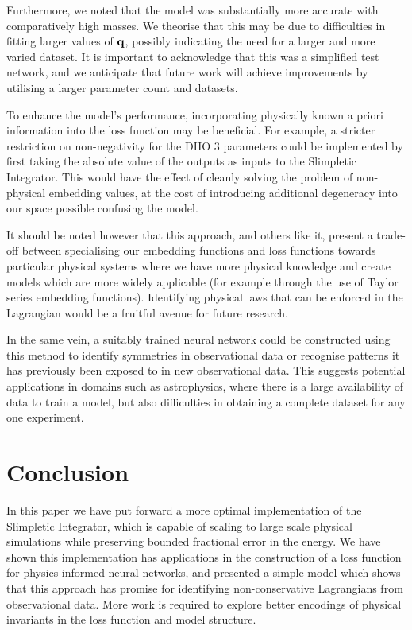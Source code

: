 Furthermore, we noted that the model was substantially more accurate with comparatively high masses. We theorise that this may be due to difficulties in fitting larger values of $\vb{q}$, possibly indicating the need for a larger and more varied dataset. It is important to acknowledge that this was a simplified test network, and we anticipate that future work will achieve improvements by utilising a larger parameter count and datasets.

To enhance the model's performance, incorporating physically known a priori information into the loss function may be beneficial. For example, a stricter restriction on non-negativity for the DHO 3 parameters could be implemented by first taking the absolute value of the outputs as inputs to the Slimpletic Integrator. This would have the effect of cleanly solving the problem of non-physical embedding values, at the cost of introducing additional degeneracy into our space possible confusing the model.

It should be noted however that this approach, and others like it, present a trade-off between specialising our embedding functions and loss functions towards particular physical systems where we have more physical knowledge and create models which are more widely applicable (for example through the use of Taylor series embedding functions).
Identifying physical laws that can be enforced in the Lagrangian would be a fruitful avenue for future research.

In the same vein, a suitably trained neural network could be constructed using this method to identify symmetries in observational data or recognise patterns it has previously been exposed to in new observational data. This suggests potential applications in domains such as astrophysics, where there is a large availability of data to train a model, but also difficulties in obtaining a complete dataset for any one experiment.

\section{Conclusion}

In this paper we have put forward a more optimal implementation of the Slimpletic Integrator, which is capable of scaling to large scale physical simulations while preserving bounded fractional error in the energy. We have shown this implementation has applications in the construction of a loss function for physics informed neural networks, and presented a simple model which shows that this approach has promise for identifying non-conservative Lagrangians from observational data. More work is required to explore better encodings of physical invariants in the loss function and model structure.
